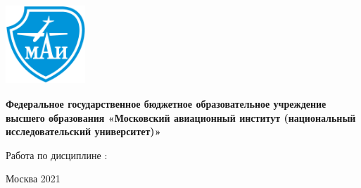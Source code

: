 
\begin{titlepage}

\begin{center}
\includegraphics[width=3cm, height=3cm]{mai_logo.png}    
\end{center}
\begin{center}
    \textbf{\Large Федеральное государственное бюджетное образовательное
учреждение высшего образования «Московский авиационный институт\newline
(национальный исследовательский университет)»  }
\end{center}
\vspace{30pt}
\begin{center}
    Работа по дисциплине :
    \textbf{  }
\end{center}
\vspace{30pt}




\vspace{150pt}
\begin{center}
    Москва
    2021
\end{center}
\end{titlepage}
\endinput

\endinput